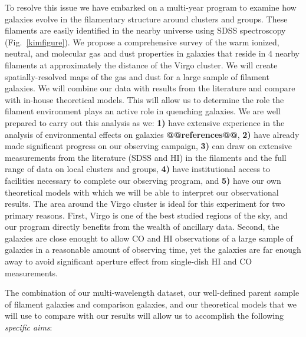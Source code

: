 \documentclass[11pt, preprint]{aastex}
\begin{document}
To resolve this issue we have embarked on a multi-year program to
examine how galaxies evolve in the filamentary structure around
clusters and groups.  These filaments are easily identified in the
nearby universe using SDSS spectroscopy
(Fig.~\ref{kimfigure}).  We propose a
comprehensive survey of the warm ionized, neutral, and
molecular gas and dust properties in galaxies that reside in 4 nearby
filaments at approximately the distance of the Virgo cluster.  We will
create spatially-resolved maps of the gas and dust for a large sample
of filament galaxies.  We will
combine our data with results from the literature and compare with in-house
theoretical models.  This will allow us to determine the
role the filament
environment plays an active role in quenching galaxies.  We are well prepared to carry
out this analysis as we: \textbf{1)} have extensive experience in the
analysis of environmental effects on galaxies \textbf{@@references@@},
\textbf{2)} have already made significant progress on our observing
campaign, \textbf{3)} can draw on extensive measurements from the
literature (SDSS and HI) in the filaments and the full range of data
on local clusters and groups, \textbf{4)} have institutional access to
facilities necessary to complete our observing program, and
\textbf{5)} have our own theoretical models with which we will be able
to interpret our observational results.  The area around the Virgo
cluster is ideal for this experiment for two primary reasons.  First,
Virgo is one of the best studied regions of the sky, and our program
directly benefits from the wealth of ancillary data.  Second, the
galaxies are close enought to allow CO and HI observations of a large
sample of galaxies in a reasonable amount of observing time, yet the galaxies are far enough away to avoid significant aperture effect from single-dish HI and CO measurements.

The combination of our multi-wavelength dataset, our well-defined
parent sample of filament galaxies and comparison galaxies, and our
theoretical models that we will use to compare with our results will allow us to accomplish the following \textit{specific aims}:

\end{document}
